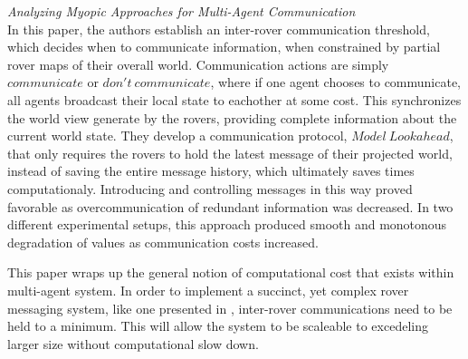 \textit{Analyzing Myopic Approaches for Multi-Agent Communication}~\cite{becker2009analyzing} \\

In this paper, the authors establish an inter-rover communication threshold, which decides when to communicate information, when constrained by partial rover maps of their overall world. Communication actions are simply $communicate$ or $don't~communicate$, where if one agent chooses to communicate, all agents broadcast their local state to eachother at some cost. This synchronizes the world view generate by the rovers, providing complete information about the current world state. They develop a communication protocol, $Model~Lookahead$, that only requires the rovers to hold the latest message of their projected world, instead of saving the entire message history, which ultimately saves times computationaly. Introducing and controlling messages in this way proved favorable as overcommunication of redundant information was decreased. In two different experimental setups, this approach produced smooth and monotonous degradation of values as communication costs increased. 

This paper wraps up the general notion of computational cost that exists within multi-agent system. In order to implement a succinct, yet complex rover messaging system, like one presented in \cite{ferber1998meta}, inter-rover communications need to be held to a minimum. This will allow the system to be scaleable to excedeling larger size without computational slow down.